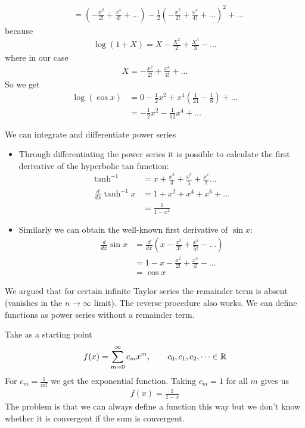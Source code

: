 \begin{ex}
\begin{itemize}
\begin{align*}
	& = \left( - \frac{x^2}{2!} + \frac{x^4}{4!} + \dots \right) - \frac 1 2 \left( - \frac{x^2}{2!} + \frac{x^4}{4!} + \dots \right) ^2 + \dots
	\end{align*}
	because
	\begin{align*}
	\log(1+X) = X - \frac {X^2} 2 + \frac{X^3} 3 - \dots 
	\end{align*}
	where in our case
	\begin{align*}
	X =  - \frac{x^2}{2!} + \frac{x^4}{4!} + \dots
	\end{align*}
	So we get 
	\begin{align*}
	\log(\cos x) & = 0 - \frac 1 2 x^2 + x^4 \left( \frac 1 {24} - \frac 1 8 \right) + \dots \\
	& = - \frac 1 2 x^2 - \frac 1 {12} x^4 + \dots 
	\end{align*}
\end{itemize}
\end{ex}
We can integrate and differentiate power series
\begin{ex}
	\begin{itemize}
		\item
		Through differentiating the power series it is possible to calculate the first derivative of the hyperbolic tan function:
		\begin{align*}
		\tanh^{-1} & = x + \frac{x^3} 3 + \frac{x^5} 5 + \frac{x^7} 7 \dots \\
		\frac d {dx} \tanh^{-1} x & = 1+ x^2 + x^4 + x^6 + \dots \\
		& = \frac{1}{1-x^2} 
		\end{align*}
		\item
		Similarly we can obtain the well-known first derivative of $\sin x$:
		\begin{align*}
		\frac{d}{dx} \sin x & = \frac{d}{dx} \left( x - \frac{x^3}{3!} + \frac{x^5}{5!} - \dots \right) \\
		& = 1- x - \frac{x^2}{2!} + \frac{x^4}{4!} - \dots \\
		& = \cos x 
	\end{align*}
\end{itemize}
\end{ex}
We argued that for certain infinite Taylor series the remainder term is absent (vanishes in the $n \to \infty$ limit).
The reverse procedure also works. We can define functions as power series without a remainder term.
	
Take as a starting point 
\begin{align*}
 f(x) = \sum_{m= 0}^\infty c_m x^m, \qquad c_0, c_1, c_2, \dots \in \mathbb R
\end{align*}
For $c_m = \frac 1 {m!}$ we get the exponential function. Taking $c_m = 1$ for all $m$ gives us
\begin{align*}
 f(x) = \frac 1 {1-x}
\end{align*}
The problem is that we can always define a function this way but we don't know whether it is convergent if the sum is convergent.

